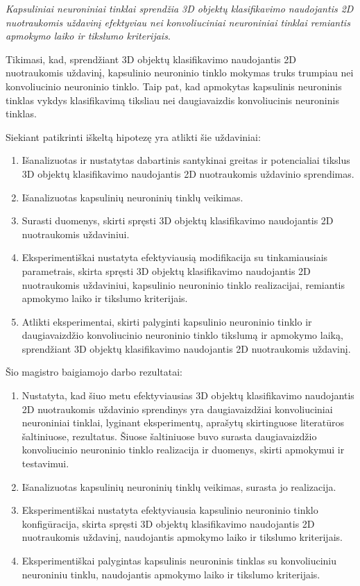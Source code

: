 \textit{Kapsuliniai neuroniniai tinklai sprendžia 3D objektų klasifikavimo naudojantis 2D nuotraukomis uždavinį efektyviau nei konvoliuciniai neuroniniai tinklai remiantis apmokymo laiko ir tikslumo kriterijais}.

Tikimasi, kad, sprendžiant 3D objektų klasifikavimo naudojantis 2D nuotraukomis uždavinį, kapsulinio neuroninio tinklo mokymas truks trumpiau nei konvoliucinio neuroninio tinklo. Taip pat, kad apmokytas kapsulinis neuroninis tinklas vykdys klasifikavimą tiksliau nei daugiavaizdis konvoliucinis neuroninis tinklas.

Siekiant patikrinti iškeltą hipotezę yra atlikti šie uždaviniai:

\begin{enumerate}
	\item Išanalizuotas ir nustatytas dabartinis santykinai greitas ir potencialiai tikslus 3D objektų klasifikavimo naudojantis 2D nuotraukomis uždavinio sprendimas.
	\item Išanalizuotas kapsulinių neuroninių tinklų veikimas.
	\item Surasti duomenys, skirti spręsti 3D objektų klasifikavimo naudojantis 2D nuotraukomis uždaviniui.
	\item Eksperimentiškai nustatyta efektyviausią modifikacija su tinkamiausiais parametrais, skirta spręsti 3D objektų klasifikavimo naudojantis 2D nuotraukomis uždaviniui, kapsulinio neuroninio tinklo realizacijai, remiantis apmokymo laiko ir tikslumo kriterijais.
	\item Atlikti eksperimentai, skirti palyginti kapsulinio neuroninio tinklo ir daugiavaizdžio konvoliucinio neuroninio tinklo tikslumą ir apmokymo laiką, sprendžiant 3D objektų klasifikavimo naudojantis 2D nuotraukomis uždavinį.
\end{enumerate}

Šio magistro baigiamojo darbo rezultatai:

\begin{enumerate}
	\item Nustatyta, kad šiuo metu efektyviausias 3D objektų klasifikavimo naudojantis 2D nuotraukomis uždavinio sprendinys yra daugiavaizdžiai konvoliuciniai neuroniniai tinklai, lyginant eksperimentų, aprašytų skirtinguose literatūros šaltiniuose, rezultatus. Šiuose šaltiniuose buvo surasta daugiavaizdžio konvoliucinio neuroninio tinklo realizacija ir duomenys, skirti apmokymui ir testavimui.
	\item Išanalizuotas kapsulinių neuroninių tinklų veikimas, surasta jo realizacija.
	\item Eksperimentiškai nustatyta efektyviausia kapsulinio neuroninio tinklo konfigūracija, skirta spręsti 3D objektų klasifikavimo naudojantis 2D nuotraukomis uždavinį, naudojantis apmokymo laiko ir tikslumo kriterijais.
	\item Eksperimentiškai palygintas kapsulinis neuroninis tinklas su konvoliuciniu neuroniniu tinklu, naudojantis apmokymo laiko ir tikslumo kriterijais.
\end{enumerate}

